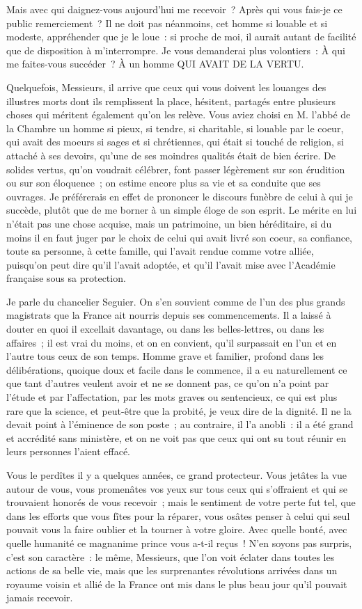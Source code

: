 \documentclass[french,twoside]{book} %
\begin{document}
Mais avec qui daignez-vous aujourd’hui me recevoir ? Après qui vous fais-je ce public remerciement ? Il ne doit pas néanmoins, cet homme si louable et si modeste, appréhender que je le loue : si proche de moi, il aurait autant de facilité que de disposition à m’interrompre. Je vous demanderai plus volontiers : À qui me faites-vous succéder ? À un homme QUI AVAIT DE LA VERTU.\par
Quelquefois, Messieurs, il arrive que ceux qui vous doivent les louanges des illustres morts dont ils remplissent la place, hésitent, partagés entre plusieurs choses qui méritent également qu’on les relève. Vous aviez choisi en M. l’abbé de la Chambre un homme si pieux, si tendre, si charitable, si louable par le coeur, qui avait des moeurs si sages et si chrétiennes, qui était si touché de religion, si attaché à ses devoirs, qu’une de ses moindres qualités était de bien écrire. De solides vertus, qu’on voudrait célébrer, font passer légèrement sur son érudition ou sur son éloquence ; on estime encore plus sa vie et sa conduite que ses ouvrages. Je préférerais en effet de prononcer le discours funèbre de celui à qui je succède, plutôt que de me borner à un simple éloge de son esprit. Le mérite en lui n’était pas une chose acquise, mais un patrimoine, un bien héréditaire, si du moins il en faut juger par le choix de celui qui avait livré son coeur, sa confiance, toute sa personne, à cette famille, qui l’avait rendue comme votre alliée, puisqu’on peut dire qu’il l’avait adoptée, et qu’il l’avait mise avec l’Académie française sous sa protection.\par
Je parle du chancelier Seguier. On s’en souvient comme de l’un des plus grands magistrats que la France ait nourris depuis ses commencements. Il a laissé à douter en quoi il excellait davantage, ou dans les belles-lettres, ou dans les affaires ; il est vrai du moins, et on en convient, qu’il surpassait en l’un et en l’autre tous ceux de son temps. Homme grave et familier, profond dans les délibérations, quoique doux et facile dans le commence, il a eu naturellement ce que tant d’autres veulent avoir et ne se donnent pas, ce qu’on n’a point par l’étude et par l’affectation, par les mots graves ou sentencieux, ce qui est plus rare que la science, et peut-être que la probité, je veux dire de la dignité. Il ne la devait point à l’éminence de son poste ; au contraire, il l’a anobli : il a été grand et accrédité sans ministère, et on ne voit pas que ceux qui ont su tout réunir en leurs personnes l’aient effacé.\par
Vous le perdîtes il y a quelques années, ce grand protecteur. Vous jetâtes la vue autour de vous, vous promenâtes vos yeux sur tous ceux qui s’offraient et qui se trouvaient honorés de vous recevoir ; mais le sentiment de votre perte fut tel, que dans les efforts que vous fîtes pour la réparer, vous osâtes penser à celui qui seul pouvait vous la faire oublier et la tourner à votre gloire. Avec quelle bonté, avec quelle humanité ce magnanime prince vous a-t-il reçus ! N'en soyons pas surpris, c’est son caractère : le même, Messieurs, que l’on voit éclater dans toutes les actions de sa belle vie, mais que les surprenantes révolutions arrivées dans un royaume voisin et allié de la France ont mis dans le plus beau jour qu’il pouvait jamais recevoir.\par
\end{document}
